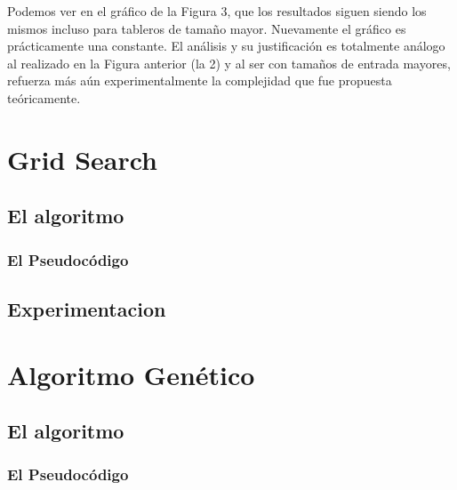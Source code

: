 \documentclass[A4paper,oneside,fleqn,11pt]{article}
\theoremstyle{definition}
\begin{document}
Podemos ver en el gráfico de la Figura 3, que los resultados siguen siendo los mismos incluso para tableros de tamaño mayor.  Nuevamente el gráfico es prácticamente una constante. El análisis y su justificación es totalmente análogo al realizado en la Figura anterior (la 2) y al ser con tamaños de entrada mayores, refuerza más aún experimentalmente la complejidad que fue propuesta teóricamente.






\section{Grid Search}



\subsection{El algoritmo}

\subsubsection{El Pseudocódigo}



\subsection{Experimentacion}


















\section{Algoritmo Genético}



\subsection{El algoritmo}

\subsubsection{El Pseudocódigo}
\end{document}
